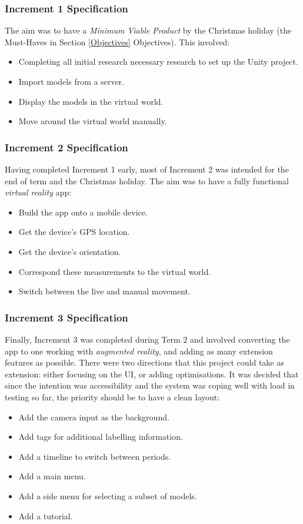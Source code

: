 \documentclass[12pt, a4paper]{article}
\begin{document}
\subsubsection{Increment 1 Specification}
The aim was to have a \textit{Minimum Viable Product} by the Christmas holiday (the Must-Haves in Section \ref{Objectives} Objectives). This involved:

\begin{itemize}
    \item Completing all initial research necessary research to set up the Unity project.
    \item Import models from a server.
    \item Display the models in the virtual world.
    \item Move around the virtual world manually. 
\end{itemize} 

\subsubsection{Increment 2 Specification}
Having completed Increment 1 early, most of Increment 2 was intended for the end of term and the Christmas holiday. The aim was to have a fully functional \textit{virtual reality} app: 
\begin{itemize}
    \item Build the app onto a mobile device.
    \item Get the device's GPS location.
    \item Get the device's orientation. 
    \item Correspond these measurements to the virtual world.
    \item Switch between the live and manual movement.
\end{itemize} 

\subsubsection{Increment 3 Specification}
\label{increment3}
Finally, Increment 3 was completed during Term 2 and involved converting the app to one working with \textit{augmented reality}, and adding as many extension features as possible. There were two directions that this project could take as extension: either focusing on the UI, or adding optimisations. It was decided that since the intention was accessibility and the system was coping well with load in testing so far, the priority should be to have a clean layout:
\begin{itemize}
    \item Add the camera input as the background.
    \item Add tags for additional labelling information.
    \item Add a timeline to switch between periods. 
    \item Add a main menu.
    \item Add a side menu for selecting a subset of models.
    \item Add a tutorial.
\end{itemize} 
\end{document}
